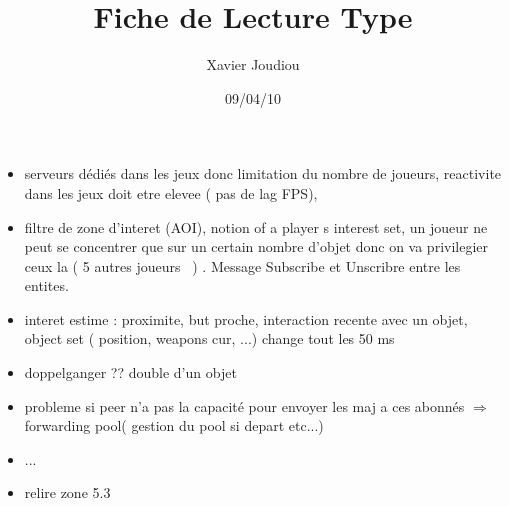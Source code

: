 \documentclass[11pt,a4paper]{article}
\title{Fiche de Lecture Type}
\author{Xavier Joudiou}
\date{09/04/10}
\begin{document}
	
  \begin{itemize}
  \renewcommand{\labelitemi}{$\Rightarrow$}
	\item serveurs dédiés dans les jeux donc limitation du nombre de joueurs, reactivite dans les jeux doit etre elevee ( pas de lag FPS),
	\item filtre de zone d'interet (AOI), notion of a player s interest set, un joueur ne peut se concentrer que sur un certain nombre d'objet donc on va privilegier ceux la ( 5 autres joueurs ~) . Message Subscribe et Unscribre entre les entites.
	\item interet estime : proximite, but proche, interaction recente avec un objet, object set ( position, weapons cur, ...) change tout les 50 ms
	\item doppelganger ?? double d'un objet 
	\item probleme si peer n'a pas la capacité  pour envoyer les maj a ces abonnés $\Rightarrow$ forwarding pool( gestion du pool si depart etc...)
	\item ...
	\item relire zone 5.3
  \end{itemize}
\end{document}
